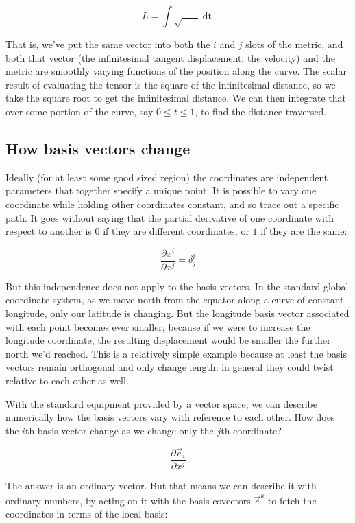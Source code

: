 $$
L =
\int
\sqrt{
    \mathop{g_{ij}(t)}
    \mathop{v^i(t)}
    \mathop{v^j(t)}
}
\mathop{dt}
$$

That is, we've put the same vector into both the $i$ and $j$ slots of the metric, and both that vector (the infinitesimal tangent displacement, the velocity) and the metric are smoothly varying functions of the position along the curve. The scalar result of evaluating the tensor is the square of the infinitesimal distance, so we take the square root to get the infinitesimal distance. We can then integrate that over some portion of the curve, say $0 \le t \le 1$, to find the distance traversed.

\subsection{How basis vectors change}

Ideally (for at least some good sized region) the coordinates are independent parameters that together specify a unique point. It is possible to vary one coordinate while holding other coordinates constant, and so trace out a specific path. It goes without saying that the partial derivative of one coordinate with respect to another is $0$ if they are different coordinates, or $1$ if they are the same:

$$
\frac{\partial x^i}{\partial x^j} = \delta^i_j
$$

But this independence does not apply to the basis vectors. In the standard global coordinate system, as we move north from the equator along a curve of constant longitude, only our latitude is changing. But the longitude basis vector associated with each point becomes ever smaller, because if we were to increase the longitude coordinate, the resulting displacement would be smaller the further north we'd reached. This is a relatively simple example because at least the basis vectors remain orthogonal and only change length; in general they could twist relative to each other as well.

With the standard equipment provided by a vector space, we can describe numerically how the basis vectors vary with reference to each other. How does the $i$th basis vector change as we change only the $j$th coordinate?

$$
\frac{\partial \vec{e}_i}{\partial x^j}
$$

The answer is an ordinary vector. But that means we can describe it with ordinary numbers, by acting on it with the basis covectors $\vec{e}^k$ to fetch the coordinates in terms of the local basis:

